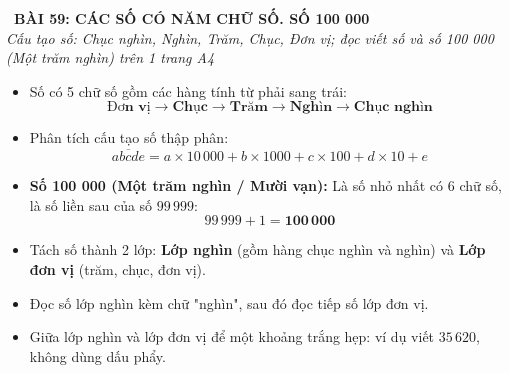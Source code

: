 \documentclass[11pt,a4paper]{article}
\begin{document}
\begin{tcolorbox}[
  enhanced,
  colback=white,
  colframe=primary,
  arc=3mm,
  boxrule=1.2pt,
  left=4mm, right=4mm, top=2.5mm, bottom=2.5mm,
  drop shadow=black!10!white
]
  \centering
  {\Large\bfseries\color{primary}\faBookmark\ BÀI 59: CÁC SỐ CÓ NĂM CHỮ SỐ. SỐ 100 000}\\[1.5mm]
  {\small\itshape\color{black!75}Cấu tạo số: Chục nghìn, Nghìn, Trăm, Chục, Đơn vị; đọc viết số và số 100 000 (Một trăm nghìn) trên 1 trang A4}
\end{tcolorbox}

\vspace{-2mm}


\noindent
\begin{minipage}[t]{0.49\textwidth}\vspace{0pt}
\begin{tcolorbox}[
  enhanced,
  colback=blue!4!white,
  colframe=blue!75!black,
  arc=2mm, boxrule=0.8pt,
  left=2mm, right=2mm, top=1.8mm, bottom=1.8mm,
  title={\footnotesize\bfseries\color{white}\faKey\ 1. Cấu tạo số có 5 chữ số}
]
{\footnotesize
\begin{itemize}\setlength{\itemsep}{1.5pt}\setlength{\leftskip}{-2.5mm}
  \item Số có 5 chữ số gồm các hàng tính từ phải sang trái:
  $$\mathbf{\text{Đơn vị}} \to \mathbf{\text{Chục}} \to \mathbf{\text{Trăm}} \to \mathbf{\text{Nghìn}} \to \mathbf{\text{Chục nghìn}}$$
  \item Phân tích cấu tạo số thập phân:
  $$\overline{abcde} = a \times 10\,000 + b \times 1000 + c \times 100 + d \times 10 + e$$
  \item \textbf{Số 100 000 (Một trăm nghìn / Mười vạn):}
  Là số nhỏ nhất có $6$ chữ số, là số liền sau của số $99\,999$:
  $$99\,999 + 1 = \mathbf{100\,000}$$
\end{itemize}
}
\end{tcolorbox}
\end{minipage}
\hfill
\begin{minipage}[t]{0.49\textwidth}\vspace{0pt}
\begin{tcolorbox}[
  enhanced,
  colback=teal!4!white,
  colframe=teal!75!black,
  arc=2mm, boxrule=0.8pt,
  left=2mm, right=2mm, top=1.8mm, bottom=1.8mm,
  title={\footnotesize\bfseries\color{white}\faSliders\ 2. Quy tắc đọc và viết số chuẩn}
]
{\footnotesize
\begin{itemize}\setlength{\itemsep}{1.5pt}\setlength{\leftskip}{-2.5mm}
  \item Tách số thành 2 lớp: \textbf{Lớp nghìn} (gồm hàng chục nghìn và nghìn) và \textbf{Lớp đơn vị} (trăm, chục, đơn vị).
  \item Đọc số lớp nghìn kèm chữ "nghìn", sau đó đọc tiếp số lớp đơn vị.
  \item Giữa lớp nghìn và lớp đơn vị để một khoảng trắng hẹp: ví dụ viết $35\,620$, không dùng dấu phẩy.
\end{itemize}
}
\end{tcolorbox}
\end{minipage}
\end{document}
